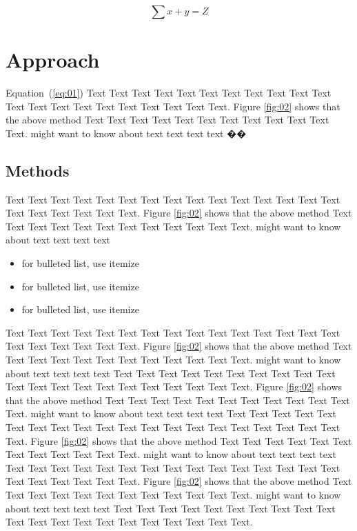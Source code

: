 \documentclass{bioinfo}
\begin{document}
\begin{equation}
\sum x+ y =Z\label{eq:01}
\end{equation}

\section{Approach}

Equation~(\ref{eq:01}) Text Text Text Text Text Text  Text Text Text Text Text Text Text Text Text  Text Text Text Text Text Text. Figure \ref{fig:02} shows that the above method  Text Text Text Text  Text Text Text Text Text Text  Text Text.  \citealp{Boffelli03} might want to know about  text text text text ��


\begin{methods}
\section{Methods}

Text Text Text Text Text Text  Text Text Text Text Text Text Text Text Text
Text Text Text Text Text Text. Figure \ref{fig:02} shows that the above method
Text Text Text Text  Text Text Text Text Text Text  Text Text.  \citealp{Boffelli03} might want
to know about  text text text text

\begin{itemize}
\item for bulleted list, use itemize
\item for bulleted list, use itemize
\item for bulleted list, use itemize
\end{itemize}



Text Text Text Text Text Text  Text Text Text Text Text Text Text Text Text  Text Text Text Text Text Text. Figure \ref{fig:02} shows that the above method  Text Text Text Text  Text Text Text Text Text Text  Text Text.  \citealp{Boffelli03} might want to know about  text text text text
Text Text Text Text Text Text  Text Text Text Text Text Text Text Text Text  Text Text Text Text Text Text. Figure \ref{fig:02} shows that the above method  Text Text Text Text  Text Text Text Text Text Text  Text Text.  \citealp{Boffelli03} might want to know about  text text text text
Text Text Text Text Text Text  Text Text Text Text Text Text Text Text Text  Text Text Text Text Text Text. Figure \ref{fig:02} shows that the above method  Text Text Text Text  Text Text Text Text Text Text  Text Text.  \citealp{Boffelli03} might want to know about  text text text text
Text Text Text Text Text Text  Text Text Text Text Text Text Text Text Text  Text Text Text Text Text Text. Figure \ref{fig:02} shows that the above method  Text Text Text Text  Text Text Text Text Text Text  Text Text.  \citealp{Boffelli03} might want to know about  text text text text
Text Text Text Text Text Text  Text Text Text Text Text Text Text Text Text  Text Text Text Text Text Text.



\end{methods}
\end{document}
